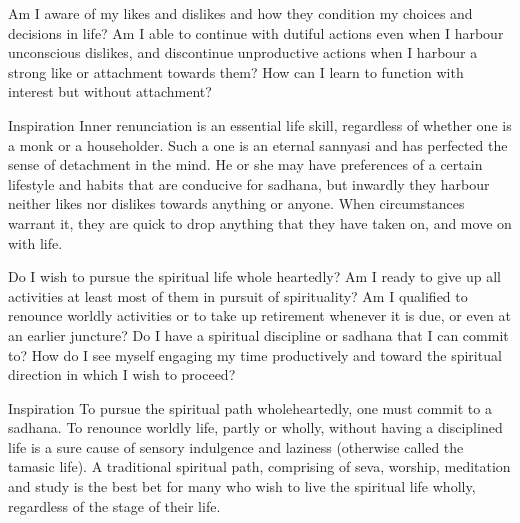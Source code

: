 \newpage
\begin{mananam}{} 
\mananamtext Am I aware of my likes and dislikes and how they condition my choices and decisions in life? Am I able to continue with dutiful actions even when I harbour unconscious dislikes, and discontinue unproductive actions when I harbour a strong like or attachment towards them? How can I learn to function with interest but without attachment?
\end{mananam}
\WritingHand{}
\begin{inspiration}{\mananamfont Inspiration}
\mananamtext Inner renunciation is an essential life skill, regardless of whether one is a monk or a householder. Such a one is an eternal sannyasi and has perfected the sense of detachment in the mind. He or she may have preferences of a certain lifestyle and habits that are conducive for sadhana, but inwardly they harbour neither likes nor dislikes towards anything or anyone. When circumstances warrant it, they are quick to drop anything that they have taken on, and move on with life.
\end{inspiration}
\newpage

\newpage
\begin{mananam}{} 
\mananamtext Do I wish to pursue the spiritual life whole heartedly? Am I ready to give up all activities at least most of them in pursuit of spirituality? Am I qualified to renounce worldly activities or to take up retirement whenever it is due, or even at an earlier juncture? Do I have a spiritual discipline or sadhana that I can commit to? How do I see myself engaging my time productively and toward the spiritual direction in which I wish to proceed?
\end{mananam}
\WritingHand{}
\begin{inspiration}{\mananamfont Inspiration}
\mananamtext To pursue the spiritual path wholeheartedly, one must commit to a sadhana. To renounce worldly life, partly or wholly, without having a disciplined life is a sure cause of sensory indulgence and laziness (otherwise called the tamasic life). A traditional spiritual path, comprising of seva, worship, meditation and study is the best bet for many who wish to live the spiritual life wholly, regardless of the stage of their life.
\end{inspiration}
\newpage


